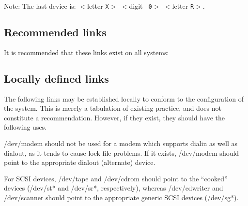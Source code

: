 \noindent
Note: The last device is: $<$letter {\tt X}$>$-$<$digit {\tt
0}$>$-$<$letter {\tt R}$>$.

\subsection{Recommended links}

It is recommended that these links exist on all systems:

\begin{nodelist}
\end{nodelist}

\subsection{Locally defined links}

The following links may be established locally to conform to the
configuration of the system.  This is merely a tabulation of existing
practice, and does not constitute a recommendation.  However, if they
exist, they should have the following uses.

\begin{nodelist}
\end{nodelist}

\noindent
{\file /dev/modem} should not be used for a modem which supports
dialin as well as dialout, as it tends to cause lock file problems.
If it exists, {\file /dev/modem} should point to the appropriate
dialout (alternate) device.

For SCSI devices, {\file /dev/tape} and {\file /dev/cdrom} should
point to the ``cooked'' devices ({\file /dev/st*} and {\file
/dev/sr*}, respectively), whereas {\file /dev/cdwriter} and {\file
/dev/scanner} should point to the appropriate generic SCSI devices
({\file /dev/sg*}).

